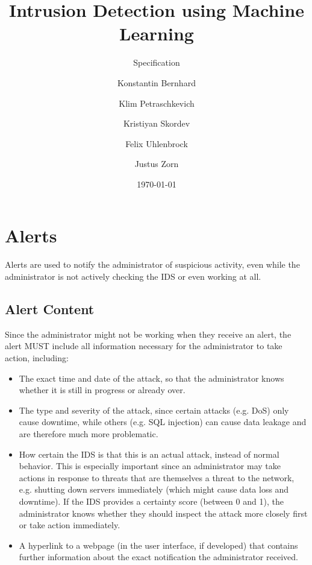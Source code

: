 \documentclass[oneside, english]{reports/assets/sdqtechreport}
\author{Konstantin Bernhard \and Klim Petraschkevich \and Kristiyan Skordev \and Felix Uhlenbrock \and Justus Zorn}
\title{Intrusion Detection using Machine Learning}
\subtitle{Specification}
\date{\today}
\begin{document}

\maketitle

\tableofcontents

\cleardoublepage


\chapter{Alerts}
\label{chap:Alerts}
Alerts are used to notify the administrator of suspicious activity, even while
the administrator is not actively checking the IDS or even working at all.

\section{Alert Content}
\label{sec:AlertContent}
Since the administrator might not be working when they receive an alert, the
alert MUST include all information necessary for the administrator to take
action, including:
\begin{itemize}
	\item The exact time and date of the attack, so that the administrator knows
	whether it is still in progress or already over.
	\item The type and severity of the attack, since certain attacks (e.g. DoS)
	only cause downtime, while others (e.g. SQL injection) can cause data leakage
	and are therefore much more problematic.
	\item How certain the IDS is that this is an actual attack, instead of normal
	behavior. This is especially important since an administrator may take
	actions in response to threats that are themselves a threat to the network,
	e.g. shutting down servers immediately (which might cause data loss and
	downtime). If the IDS provides a certainty score (between 0 and 1), the
	administrator knows whether they should inspect the attack more closely first
	or take action immediately.
	\item A hyperlink to a webpage (in the user interface, if developed)
	that contains further information about the exact notification the
	administrator received.
\end{itemize}
\end{document}
